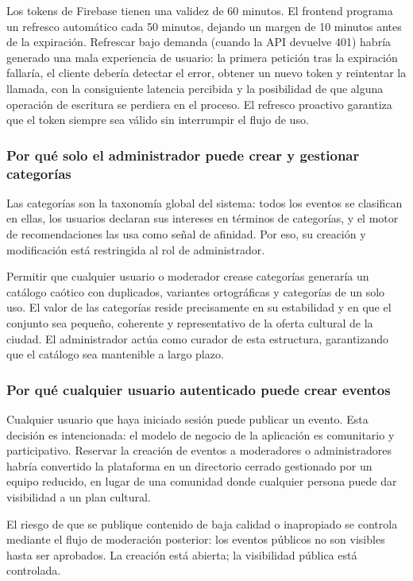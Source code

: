 Los tokens de Firebase tienen una validez de 60 minutos. El frontend programa un refresco automático cada 50 minutos, dejando un margen de 10 minutos antes de la expiración. Refrescar bajo demanda (cuando la API devuelve 401) habría generado una mala experiencia de usuario: la primera petición tras la expiración fallaría, el cliente debería detectar el error, obtener un nuevo token y reintentar la llamada, con la consiguiente latencia percibida y la posibilidad de que alguna operación de escritura se perdiera en el proceso. El refresco proactivo garantiza que el token siempre sea válido sin interrumpir el flujo de uso.

\subsubsection{Por qué solo el administrador puede crear y gestionar categorías}

Las categorías son la taxonomía global del sistema: todos los eventos se clasifican en ellas, los usuarios declaran sus intereses en términos de categorías, y el motor de recomendaciones las usa como señal de afinidad. Por eso, su creación y modificación está restringida al rol de administrador.

Permitir que cualquier usuario o moderador crease categorías generaría un catálogo caótico con duplicados, variantes ortográficas y categorías de un solo uso. El valor de las categorías reside precisamente en su estabilidad y en que el conjunto sea pequeño, coherente y representativo de la oferta cultural de la ciudad. El administrador actúa como curador de esta estructura, garantizando que el catálogo sea mantenible a largo plazo.

\subsubsection{Por qué cualquier usuario autenticado puede crear eventos}

Cualquier usuario que haya iniciado sesión puede publicar un evento. Esta decisión es intencionada: el modelo de negocio de la aplicación es comunitario y participativo. Reservar la creación de eventos a moderadores o administradores habría convertido la plataforma en un directorio cerrado gestionado por un equipo reducido, en lugar de una comunidad donde cualquier persona puede dar visibilidad a un plan cultural.

El riesgo de que se publique contenido de baja calidad o inapropiado se controla mediante el flujo de moderación posterior: los eventos públicos no son visibles hasta ser aprobados. La creación está abierta; la visibilidad pública está controlada.

